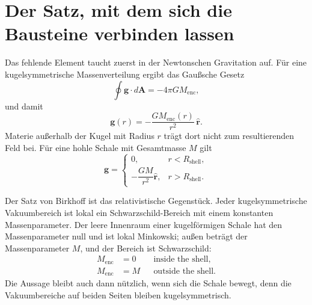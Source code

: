 \section{Der Satz, mit dem sich die Bausteine verbinden lassen}

Das fehlende Element taucht zuerst in der Newtonschen Gravitation auf. Für eine kugelsymmetrische Massenverteilung ergibt das Gaußsche Gesetz
\begin{equation}
\oint\mathbf g\cdot d\mathbf A=-4\pi G M_{\mathrm{enc}},
\end{equation}
und damit
\begin{equation}
\mathbf g(r)=-\frac{G M_{\mathrm{enc}}(r)}{r^2}\,\hat{\mathbf r}.
\label{eq:l05-shell-theorem}
\end{equation}
Materie außerhalb der Kugel mit Radius \(r\) trägt dort nicht zum resultierenden Feld bei. Für eine hohle Schale mit Gesamtmasse \(M\) gilt
\begin{equation}
\mathbf g=
\begin{cases}
0, & r<R_{\mathrm{shell}},\\[3pt]
-\dfrac{GM}{r^2}\hat{\mathbf r}, & r>R_{\mathrm{shell}}.
\end{cases}
\end{equation}

Der Satz von Birkhoff ist das relativistische Gegenstück. Jeder kugelsymmetrische Vakuumbereich ist lokal ein Schwarzschild-Bereich mit einem konstanten Massenparameter. Der leere Innenraum einer kugelförmigen Schale hat den Massenparameter null und ist lokal Minkowski; außen beträgt der Massenparameter \(M\), und der Bereich ist Schwarzschild:
\begin{equation}
\begin{aligned}
M_{\mathrm{enc}}&=0 && \text{inside the shell},\\
M_{\mathrm{enc}}&=M && \text{outside the shell}.
\end{aligned}
\label{eq:l05-birkhoff}
\end{equation}
Die Aussage bleibt auch dann nützlich, wenn sich die Schale bewegt, denn die Vakuumbereiche auf beiden Seiten bleiben kugelsymmetrisch.


